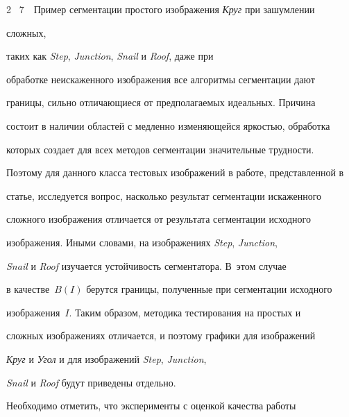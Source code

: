 \begin{multicols}{2}
{{\figurename~7}\ \ \small{Пример сегментации простого изображения \textit{Круг} при зашумлении}}











\addtocounter{figure}{1}





\noindent


 сложных, 


таких как \textit{Step}, \textit{Junction}, \textit{Snail} и \textit{Roof}, даже при 


обработке неискаженного изображения все алгоритмы сегментации дают 


границы, сильно отличающиеся от предполагаемых идеальных. Причина 


состоит в наличии областей с медленно изменяющейся яркостью, обработка 


которых создает для всех методов сегментации значительные трудности. 


Поэтому для данного класса тестовых изображений в работе, представленной в 


статье, исследуется вопрос, насколько результат сегментации искаженного 


сложного изображения отличается от результата сегментации исходного 


изображения. Иными словами, на изображениях \textit{Step}, \textit{Junction}, 


\textit{Snail} и \textit{Roof} изучается устойчивость сегментатора. В~этом случае 


в качестве~$B(I)$ берутся границы, полученные при сегментации исходного 


изображения~$I$. Таким образом, методика тестирования на простых и 


сложных изображениях отличается, и поэтому графики для изображений 


\textit{Круг} и \textit{Угол} и для изображений \textit{Step}, \textit{Junction}, 


\textit{Snail} и \textit{Roof} будут приведены отдельно.


  


  Необходимо отметить, что эксперименты с оценкой качества работы 



\end{multicols}
